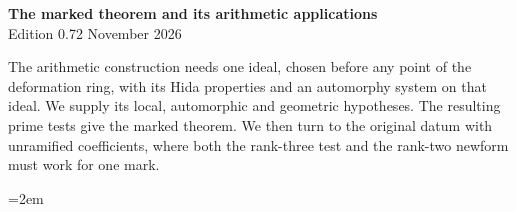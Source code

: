 \begin{center}
{\Large\bfseries The marked theorem and its arithmetic applications}\\[4pt]
Edition 0.72  November 2026
\end{center}

The arithmetic construction needs one ideal, chosen before any
point of the deformation ring, with its Hida properties and an
automorphy system on that ideal. We supply its local,
automorphic and geometric hypotheses. The resulting prime tests
give the marked theorem. We then turn to the original datum with
unramified coefficients, where both the rank-three test and the
rank-two newform must work for one mark.

\begingroup\emergencystretch=2em\providecommand{\Sha}{\mathop{\mathrm{Sha}}}









\endgroup
